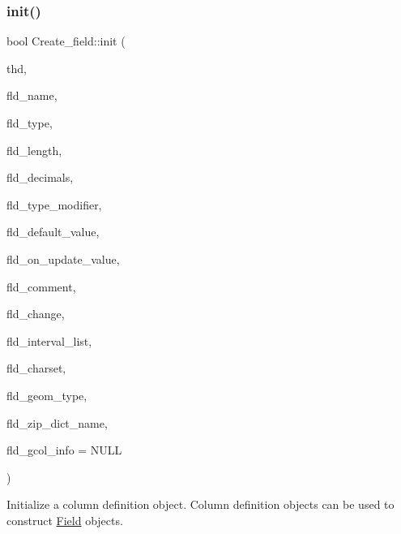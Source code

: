 \subsubsection{\texorpdfstring{init()}{init()}}
{\footnotesize\ttfamily bool Create\+\_\+field\+::init (\begin{DoxyParamCaption}\item[{T\+HD $\ast$}]{thd,  }\item[{const char $\ast$}]{fld\+\_\+name,  }\item[{enum\+\_\+field\+\_\+types}]{fld\+\_\+type,  }\item[{const char $\ast$}]{fld\+\_\+length,  }\item[{const char $\ast$}]{fld\+\_\+decimals,  }\item[{uint}]{fld\+\_\+type\+\_\+modifier,  }\item[{\mbox{\hyperlink{classItem}{Item}} $\ast$}]{fld\+\_\+default\+\_\+value,  }\item[{\mbox{\hyperlink{classItem}{Item}} $\ast$}]{fld\+\_\+on\+\_\+update\+\_\+value,  }\item[{L\+E\+X\+\_\+\+S\+T\+R\+I\+NG $\ast$}]{fld\+\_\+comment,  }\item[{const char $\ast$}]{fld\+\_\+change,  }\item[{\mbox{\hyperlink{classList}{List}}$<$ String $>$ $\ast$}]{fld\+\_\+interval\+\_\+list,  }\item[{const C\+H\+A\+R\+S\+E\+T\+\_\+\+I\+N\+FO $\ast$}]{fld\+\_\+charset,  }\item[{uint}]{fld\+\_\+geom\+\_\+type,  }\item[{const L\+E\+X\+\_\+\+C\+S\+T\+R\+I\+NG $\ast$}]{fld\+\_\+zip\+\_\+dict\+\_\+name,  }\item[{\mbox{\hyperlink{classGenerated__column}{Generated\+\_\+column}} $\ast$}]{fld\+\_\+gcol\+\_\+info = {\ttfamily NULL} }\end{DoxyParamCaption})}

Initialize a column definition object. Column definition objects can be used to construct \mbox{\hyperlink{classField}{Field}} objects.


